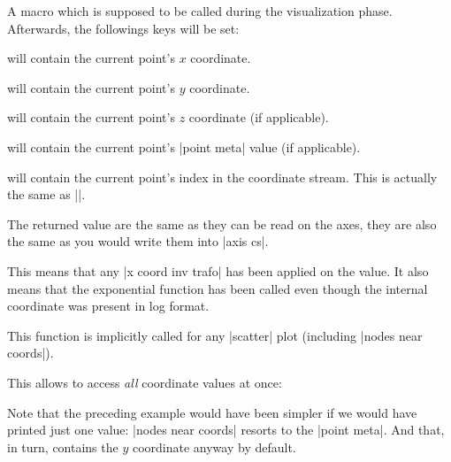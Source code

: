 \begin{command}{\pgfplotspointgetcoordinates}
	A macro which is supposed to be called during the visualization phase. Afterwards, the followings keys will be set:

	 will contain the current point's $x$ coordinate. 

	 will contain the current point's $y$ coordinate. 

	 will contain the current point's $z$ coordinate (if applicable). 

	 will contain the current point's |point meta| value (if applicable). 

	 will contain the current point's index in the coordinate stream. This is actually the same as |\coordindex|.
	
	The returned value are the same as they can be read on the axes, they are also the same as you would write them into |axis cs|.

	This means that any |x coord inv trafo| has been applied on the value. It also means that the exponential function has been called even though the internal coordinate was present in log format.

	This function is implicitly called for any |scatter| plot (including |nodes near coords|).

	This allows to access \emph{all} coordinate values at once:
\begin{codeexample}[]
\end{codeexample}
	Note that the preceding example would have been simpler if we would have printed just one value: |nodes near coords| resorts to the |point meta|. And that, in turn, contains the $y$ coordinate anyway by default.


\end{command}
